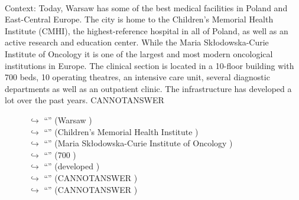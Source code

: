 \documentclass[11pt,a4paper, onecolumn]{article}
\begin{document}
\\ Context: Today, Warsaw has some of the best medical facilities in Poland and East-Central Europe. The city is home to the Children's Memorial Health Institute (CMHI), the highest-reference hospital in all of Poland, as well as an active research and education center. While the Maria Skłodowska-Curie Institute of Oncology it is one of the largest and most modern oncological institutions in Europe. The clinical section is located in a 10-floor building with 700 beds, 10 operating theatres, an intensive care unit, several diagnostic departments as well as an outpatient clinic. The infrastructure has developed a lot over the past years. CANNOTANSWER

\begin{figure}[t] \small \begin{tcolorbox}[boxsep=0pt,left=5pt,right=0pt,top=2pt,colback = yellow!5] \begin{dialogue}
 \small 
\colorbox{pink!25}{$\hookrightarrow$}
{ ``'' (Warsaw ) }
\\
\colorbox{pink!25}{$\hookrightarrow$}
{ ``'' (Children's Memorial Health Institute ) }
\\
\colorbox{pink!25}{$\hookrightarrow$}
{ ``'' (Maria Skłodowska-Curie Institute of Oncology ) }
\\
\colorbox{pink!25}{$\hookrightarrow$}
{ ``'' (700 ) }
\\
\colorbox{pink!25}{$\hookrightarrow$}
{ ``'' (developed ) }
\\
\colorbox{pink!25}{$\hookrightarrow$}
{ ``'' (CANNOTANSWER ) }
\\
\colorbox{pink!25}{$\hookrightarrow$}
{ ``'' (CANNOTANSWER ) }
\\

\end{dialogue}
\end{tcolorbox}
\end{figure}
\end{document}
